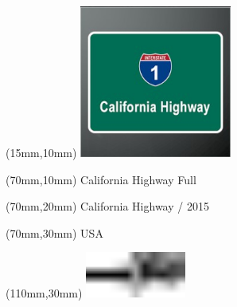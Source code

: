 \null\newpage
\begin{textblock*}{50mm}(15mm,10mm)%
\includegraphics[width=50mm]{LG/2015-05-20_00077.png}
\end{textblock*}
\begin{textblock*}{130mm}(70mm,10mm)%
{\fontsize{20}{20}\selectfont California Highway Full}\\
\end{textblock*}
\begin{textblock*}{120mm}(70mm,20mm)%
{\fontsize{16}{16}\selectfont California Highway / 2015}\\
\end{textblock*}
\begin{textblock*}{120mm}(70mm,30mm)%
{\fontsize{12}{12}\selectfont USA}
\end{textblock*}
\begin{textblock*}{30mm}(110mm,30mm)%
\centering
\includegraphics[height=15mm]{icons/tofinish.pdf}
\end{textblock*}
